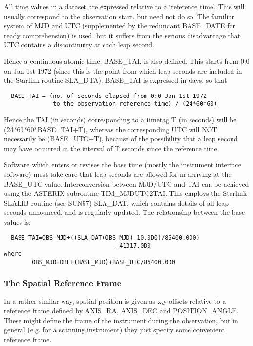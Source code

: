 All time values  in  a  dataset  are
expressed   relative   to  a  `reference  time'.   This  will  usually
correspond to the observation start, but need not do so.  The familiar
system  of  MJD  and  UTC (supplemented by the redundant BASE\_DATE for
ready  comprehension)  is  used,  but  it  suffers  from  the  serious
disadvantage  that  UTC  contains a discontinuity at each leap second.

Hence a continuous atomic  time,  BASE\_TAI,  is  also  defined.   This
starts  from  0:0  on Jan 1st 1972 (since this is the point from which
leap seconds are included in the Starlink routine SLA\_DTA).   BASE\_TAI
is expressed in days, so that

\begin{verbatim}
  BASE_TAI = (no. of seconds elapsed from 0:0 Jan 1st 1972 
              to the observation reference time) / (24*60*60)
\end{verbatim}

Hence the TAI (in seconds) corresponding to a timetag T  (in  seconds)
will  be (24*60*60*BASE\_TAI+T), whereas the corresponding UTC will NOT
necessarily be (BASE\_UTC+T), because of the possibility  that  a  leap
second  may  have  occurred  in  the  interval  of T seconds since the
reference time.

Software which enters or revises the base time (mostly the  instrument
interface  software)  must take care that leap seconds are allowed for
in arriving at the BASE\_UTC value.   Interconversion  between  MJD/UTC
and  TAI  can be achieved using the ASTERIX subroutine TIM\_MJDUTC2TAI.
This employs the Starlink SLALIB routine (see  SUN67)  SLA\_DAT,  which
contains  details  of  all  leap  seconds  announced, and is regularly
updated.  The relationship between the base values is:

\begin{verbatim}
  BASE_TAI=OBS_MJD+((SLA_DAT(OBS_MJD)-10.0D0)/86400.0D0)
                                -41317.0D0
where
        OBS_MJD=DBLE(BASE_MJD)+BASE_UTC/86400.0D0
\end{verbatim}

\subsubsection{The Spatial Reference Frame}

In a rather similar way,  spatial
position is given as x,y offsets relative to a reference frame defined
by AXIS\_RA, AXIS\_DEC and POSITION\_ANGLE.  These might define the frame
of  the instrument during the observation, but in general (e.g.  for a
scanning instrument)  they  just  specify  some  convenient  reference
frame.

